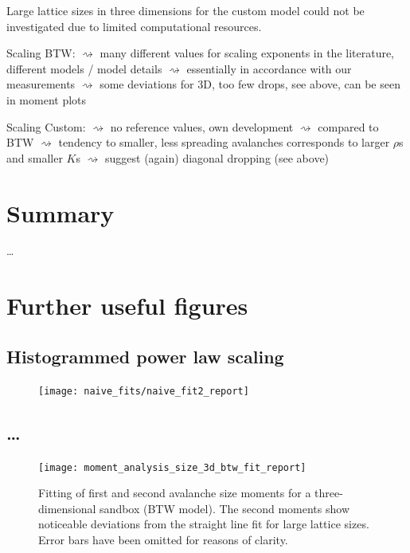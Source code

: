 Large lattice sizes in three dimensions for the custom model could not be investigated due to limited computational
resources.


Scaling BTW:
$\rightsquigarrow$ many different values for scaling exponents in the literature, different models / model details
$\rightsquigarrow$ essentially in accordance with our measurements
$\rightsquigarrow$ some deviations for 3D, too few drops, see above, can be seen in moment plots

Scaling Custom:
$\rightsquigarrow$ no reference values, own development
$\rightsquigarrow$ compared to BTW $\rightsquigarrow$ tendency to smaller, less spreading avalanches corresponds to
                   larger $\rho$s and smaller $K$s \checkmark $\rightsquigarrow$ suggest (again) diagonal dropping
                   (see above)


\section{Summary}
\label{sec:summary}

\dots%


\appendix*

\section{Further useful figures}
\label{sec:app}

\subsection{Histogrammed power law scaling}
\label{app:naiveFit}
\begin{figure}[!h]%
    \centering
    \texttt{[image: naive\_fits/naive\_fit2\_report]}
    \caption{}
    \label{fig:naiveFit}
\end{figure}

\subsection{\dots}
\label{app:naiveFit}
\begin{figure}[!h]%
    \centering
    \texttt{[image: moment\_analysis\_size\_3d\_btw\_fit\_report]}
    \caption{Fitting of first and second avalanche size moments for a three-dimensional sandbox (BTW model).
             The second moments show noticeable deviations from the straight line fit for large lattice sizes.
             Error bars have been omitted for reasons of clarity.}
    \label{fig:btwSizeFit}
\end{figure}
